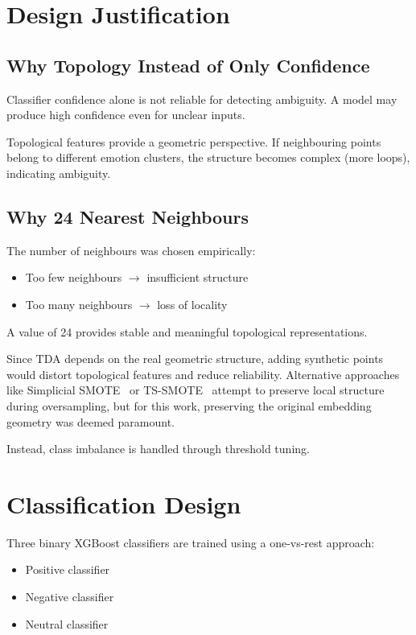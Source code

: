 \section{Design Justification}

\subsection{Why Topology Instead of Only Confidence}

Classifier confidence alone is not reliable for detecting ambiguity. A model may produce
high confidence even for unclear inputs.

Topological features provide a geometric perspective. If neighbouring points belong to different
emotion clusters, the structure becomes complex (more loops), indicating ambiguity.

\subsection{Why 24 Nearest Neighbours}

The number of neighbours was chosen empirically:
\begin{itemize}
    \item Too few neighbours $\rightarrow$ insufficient structure
    \item Too many neighbours $\rightarrow$ loss of locality
\end{itemize}
A value of 24 provides stable and meaningful topological representations.

Since TDA depends on the real geometric structure, adding synthetic points would distort
topological features and reduce reliability. Alternative approaches like Simplicial
SMOTE~\cite{smote} or TS-SMOTE~\cite{ts_smote} attempt to preserve local structure
during oversampling, but for this work, preserving the original embedding geometry was deemed
paramount.

Instead, class imbalance is handled through threshold tuning.

\section{Classification Design}

Three binary XGBoost classifiers are trained using a one-vs-rest approach:
\begin{itemize}
    \item Positive classifier
    \item Negative classifier
    \item Neutral classifier
\end{itemize}

